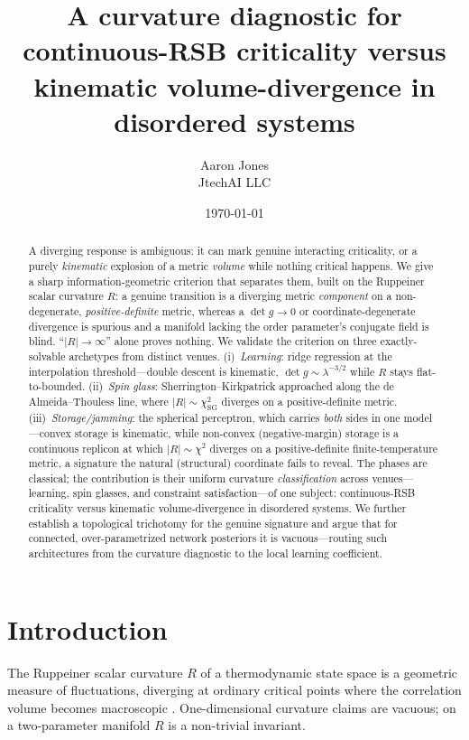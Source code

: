 \documentclass[a4paper,11pt]{article}
\title{A curvature diagnostic for continuous-RSB criticality versus\\
       kinematic volume-divergence in disordered systems}
\author{Aaron Jones\\ \small JtechAI LLC}
\date{\today}
\theoremstyle{plain}
\theoremstyle{definition}
\theoremstyle{remark}
\newcommand{\Ric}{R}
\newcommand{\detg}{\det g}
\begin{document}
\maketitle

\begin{abstract}
A diverging response is ambiguous: it can mark genuine interacting criticality, or a purely \emph{kinematic}
explosion of a metric \emph{volume} while nothing critical happens. We give a sharp information-geometric
criterion that separates them, built on the Ruppeiner scalar curvature $\Ric$: a genuine transition is a
diverging metric \emph{component} on a non-degenerate, \emph{positive-definite} metric, whereas a
$\detg\to0$ or coordinate-degenerate divergence is spurious and a manifold lacking the order parameter's
conjugate field is blind. ``$|\Ric|\to\infty$'' alone proves nothing. We validate the criterion on three
exactly-solvable archetypes from distinct venues. (i)~\emph{Learning}: ridge regression at the interpolation
threshold---double descent is kinematic, $\detg\sim\lambda^{-3/2}$ while $\Ric$ stays flat-to-bounded.
(ii)~\emph{Spin glass}: Sherrington--Kirkpatrick approached along the de Almeida--Thouless line, where
$|\Ric|\sim\chi_{\mathrm{SG}}^2$ diverges on a positive-definite metric. (iii)~\emph{Storage/jamming}: the
spherical perceptron, which carries \emph{both} sides in one model---convex storage is kinematic, while
non-convex (negative-margin) storage is a continuous replicon at which $|\Ric|\sim\chi^2$ diverges on a
positive-definite finite-temperature metric, a signature the natural (structural) coordinate fails to
reveal. The phases are classical; the contribution is their uniform curvature \emph{classification} across
venues---learning, spin glasses, and constraint satisfaction---of one subject: continuous-RSB criticality
versus kinematic volume-divergence in disordered systems. We further establish a topological trichotomy for
the genuine signature and argue that for connected, over-parametrized network posteriors it is
vacuous---routing such architectures from the curvature diagnostic to the local learning coefficient.
\end{abstract}

\section{Introduction}\label{sec:intro}
The Ruppeiner scalar curvature $\Ric$ of a thermodynamic state space is a geometric measure of fluctuations,
diverging at ordinary critical points where the correlation volume becomes macroscopic
\cite{ruppeiner1995,janyszek1990}. One-dimensional curvature claims are vacuous; on a two-parameter
manifold $\Ric$ is a non-trivial invariant.
\end{document}
